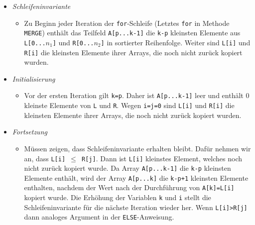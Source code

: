 \documentclass[
    12pt,
    a4paper,
    ngerman,
    color=3b,%
    marginpar=false,
    colorback=false,
    leqno,
]{tudaexercise}
\begin{document}
\begin{itemize}
\begin{itemize}
              \item \textit{Schleifeninvariante}
                    \begin{itemize}
                        \item[]
                              Zu Beginn jeder Iteration der \texttt{for}-Schleife (Letztes \texttt{for} in Methode \texttt{MERGE}) enthält
                              das Teilfeld \texttt{A[p...k-1]} die \texttt{k-p} kleinsten Elemente aus \texttt{L[0...$n_1$]} und \texttt{R[0...$n_2$]}
                              in sortierter Reihenfolge. Weiter sind \texttt{L[i]} und \texttt{R[i]} die kleinsten Elemente ihrer Arrays, die noch nicht
                              zurück kopiert wurden.
                    \end{itemize}
              \item \textit{Initialisierung}
                    \begin{itemize}
                        \item[]
                              Vor der ersten Iteration gilt \texttt{k=p}. Daher ist \texttt{A[p...k-1]} leer und enthält 0 kleinste Elemente von
                              \texttt{L} und \texttt{R}. Wegen \texttt{i=j=0} sind \texttt{L[i]} und \texttt{R[i]} die kleinsten Elemente ihrer
                              Arrays, die noch nicht zurück kopiert wurden.
                    \end{itemize}
                    \clearpage
              \item \textit{Fortsetzung}
                    \begin{itemize}
                        \item[]
                              Müssen zeigen, dass Schleifeninvariante erhalten bleibt. Dafür nehmen wir an, dass \texttt{L[i] $\leq$ R[j]}. Dann ist
                              \texttt{L[i]} kleinstes Element, welches noch nicht zurück kopiert wurde. Da Array \texttt{A[p...k-1]} die \texttt{k-p}
                              kleinsten Elemente enthält, wird der Array \texttt{A[p...k]} die \texttt{k-p+1} kleinsten Elemente enthalten, nachdem
                              der Wert nach der Durchführung von \texttt{A[k]=L[i]} kopiert wurde. Die Erhöhung der Variablen \texttt{k} und \texttt{i}
                              stellt die Schleifeninvariante für die nächste Iteration wieder her. Wenn \texttt{L[i]>R[j]} dann analoges Argument
                              in der \texttt{ELSE}-Anweisung.
                    \end{itemize}

\end{itemize}
\end{itemize}
\end{document}
